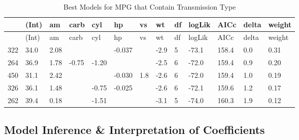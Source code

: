 \documentclass[]{article}
\newenvironment{Shaded}{\begin{snugshade}}{\end{snugshade}}
\newcommand{\KeywordTok}[1]{\textcolor[rgb]{0.13,0.29,0.53}{\textbf{{#1}}}}
\newcommand{\DataTypeTok}[1]{\textcolor[rgb]{0.13,0.29,0.53}{{#1}}}
\newcommand{\DecValTok}[1]{\textcolor[rgb]{0.00,0.00,0.81}{{#1}}}
\newcommand{\StringTok}[1]{\textcolor[rgb]{0.31,0.60,0.02}{{#1}}}
\newcommand{\CommentTok}[1]{\textcolor[rgb]{0.56,0.35,0.01}{\textit{{#1}}}}
\newcommand{\OtherTok}[1]{\textcolor[rgb]{0.56,0.35,0.01}{{#1}}}
\newcommand{\NormalTok}[1]{{#1}}
\begin{document}
\begin{Shaded}
\end{Shaded}

\begin{longtable}[]{@{}lllllllllllll@{}}
\caption{Best Models for MPG that Contain Transmission
Type}\tabularnewline
\toprule
& (Int) & am & carb & cyl & hp & vs & wt & df & logLik & AICc & delta &
weight\tabularnewline
\midrule
\endfirsthead
\toprule
& (Int) & am & carb & cyl & hp & vs & wt & df & logLik & AICc & delta &
weight\tabularnewline
\midrule
\endhead
322 & 34.0 & 2.08 & & & -0.037 & & -2.9 & 5 & -73.1 & 158.4 & 0.0 &
0.31\tabularnewline
264 & 36.9 & 1.78 & -0.75 & -1.20 & & & -2.5 & 6 & -72.0 & 159.4 & 0.9 &
0.20\tabularnewline
450 & 31.1 & 2.42 & & & -0.030 & 1.8 & -2.6 & 6 & -72.0 & 159.4 & 1.0 &
0.19\tabularnewline
326 & 36.1 & 1.48 & & -0.75 & -0.025 & & -2.6 & 6 & -72.1 & 159.6 & 1.2
& 0.17\tabularnewline
262 & 39.4 & 0.18 & & -1.51 & & & -3.1 & 5 & -74.0 & 160.3 & 1.9 &
0.12\tabularnewline
\bottomrule
\end{longtable}

\subsection{Model Inference \& Interpretation of
Coefficients}\label{model-inference-interpretation-of-coefficients}
\end{document}
